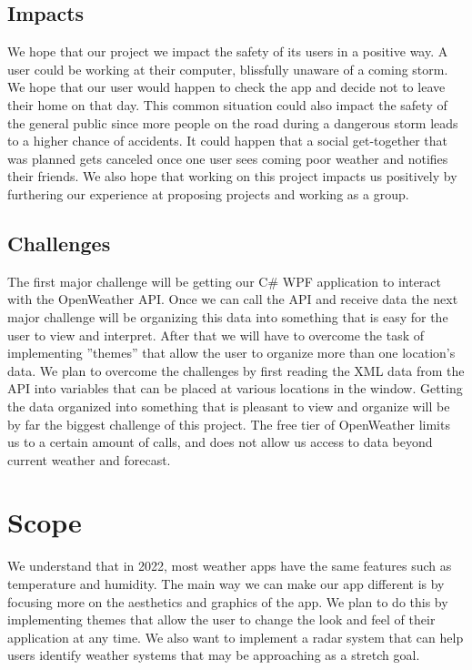 \documentclass[10pt,conference,onecolumn,compsoc]{IEEEtran}
\begin{document}

\subsection{Impacts}
We hope that our project we impact the safety of its users in a positive way. A user could be working at their computer, blissfully unaware of a coming storm. We hope that our user would happen to check the app and decide not to leave their home on that day. This common situation could also impact the safety of the general public since more people on the road during a dangerous storm leads to a higher chance of accidents. It could happen that a social get-together that was planned gets canceled once one user sees coming poor weather and notifies their friends. We also hope that working on this project impacts us positively by furthering our experience at proposing projects and working as a group.  	



\subsection{Challenges}
	The first major challenge will be getting our C\# WPF application to interact with the OpenWeather API. Once we can call the API and receive data the next major challenge will be organizing this data into something that is easy for the user to view and interpret. After that we will have to overcome the task of implementing ''themes'' that allow the user to organize more than one location's data. We plan to overcome the challenges by first reading the XML data from the API into variables that can be placed at various locations in the window. Getting the data organized into something that is pleasant to view and organize will be by far the biggest challenge of this project. The free tier of OpenWeather limits us to a certain amount of calls, and does not allow us access to data beyond current weather and forecast.


\section{Scope}
	We understand that in 2022, most weather apps have the same features such as temperature and humidity. The main way we can make our app different is by focusing more on the aesthetics and graphics of the app. We plan to do this by
	implementing themes that allow the user to change the look and feel of their application at any time. We also want to implement a radar system that can help users identify weather systems that may be approaching as a stretch goal.
\end{document}
